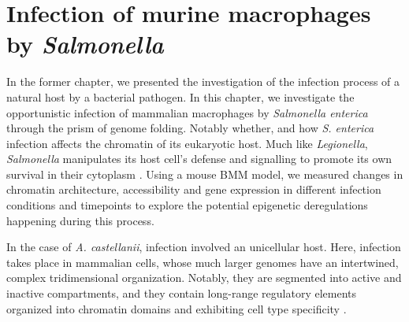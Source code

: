 \textsc{}%

\chapter{Infection of murine macrophages by \textit{Salmonella}} %

\label{ch:02-03} %


In the former chapter, we presented the investigation of the infection process of a natural host by a bacterial pathogen. In this chapter, we investigate the opportunistic infection of mammalian macrophages by \textit{Salmonella enterica} through the prism of genome folding. Notably whether, and how \textit{S. enterica} infection affects the chromatin of its eukaryotic host. Much like \textit{Legionella}, \textit{Salmonella} manipulates its host cell's defense and signalling to promote its own survival in their cytoplasm \cite{larockSalmonellaeInteractionsHost2015}. Using a mouse \acrfull{BMM} model, we measured changes in chromatin architecture, accessibility and gene expression in different infection conditions and timepoints to explore the potential epigenetic deregulations happening during this process.

In the case of \textit{A. castellanii}, infection involved an unicellular host. Here, infection takes place in mammalian cells, whose much larger genomes have an intertwined, complex tridimensional organization. Notably, they are segmented into active and inactive compartments, and they contain long-range regulatory elements organized into chromatin domains and exhibiting cell type specificity \cite{schmittCompendiumChromatinContact2016}.

